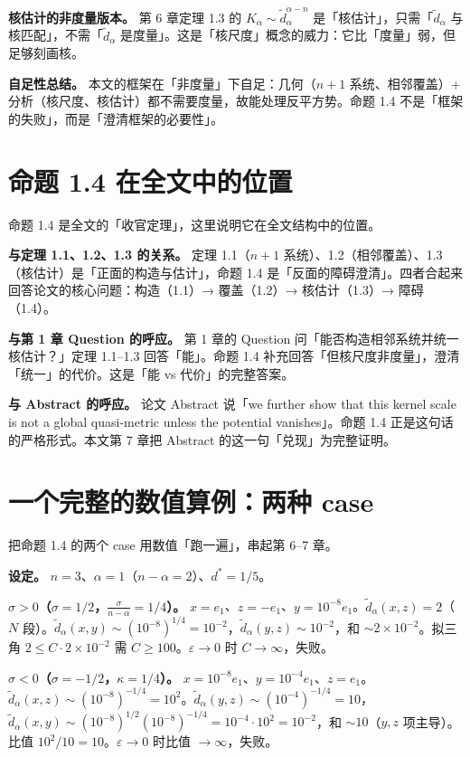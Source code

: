 \documentclass[a4paper,11pt,openany]{ctexbook}
\numberwithin{equation}{chapter}
\numberwithin{figure}{chapter}
\numberwithin{table}{chapter}
\begin{document}
\textbf{核估计的非度量版本。} 第 6 章定理 1.3 的 $K_\alpha\sim\widetilde d_\alpha^{\alpha-n}$ 是「核估计」，只需「$\widetilde d_\alpha$ 与核匹配」，不需「$\widetilde d_\alpha$ 是度量」。这是「核尺度」概念的威力：它比「度量」弱，但足够刻画核。

\textbf{自足性总结。} 本文的框架在「非度量」下自足：几何（$n+1$ 系统、相邻覆盖）+ 分析（核尺度、核估计）都不需要度量，故能处理反平方势。命题 1.4 不是「框架的失败」，而是「澄清框架的必要性」。

\section{命题 1.4 在全文中的位置}

命题 1.4 是全文的「收官定理」，这里说明它在全文结构中的位置。

\textbf{与定理 1.1、1.2、1.3 的关系。} 定理 1.1（$n+1$ 系统）、1.2（相邻覆盖）、1.3（核估计）是「正面的构造与估计」，命题 1.4 是「反面的障碍澄清」。四者合起来回答论文的核心问题：构造（1.1）→ 覆盖（1.2）→ 核估计（1.3）→ 障碍（1.4）。

\textbf{与第 1 章 Question 的呼应。} 第 1 章的 Question 问「能否构造相邻系统并统一核估计？」定理 1.1–1.3 回答「能」。命题 1.4 补充回答「但核尺度非度量」，澄清「统一」的代价。这是「能 vs 代价」的完整答案。

\textbf{与 Abstract 的呼应。} 论文 Abstract 说「we further show that this kernel scale is not a global quasi-metric unless the potential vanishes」。命题 1.4 正是这句话的严格形式。本文第 7 章把 Abstract 的这一句「兑现」为完整证明。

\section{一个完整的数值算例：两种 case}

把命题 1.4 的两个 case 用数值「跑一遍」，串起第 6–7 章。

\textbf{设定。} $n=3$、$\alpha=1$（$n-\alpha=2$）、$d^*=1/5$。

\textbf{$\sigma>0$（$\sigma=1/2$，$\frac{\sigma}{n-\alpha}=1/4$）。} $x=e_1$、$z=-e_1$、$y=10^{-8}e_1$。$\widetilde d_\alpha(x,z)=2$（$N$ 段）。$\widetilde d_\alpha(x,y)\sim(10^{-8})^{1/4}=10^{-2}$，$\widetilde d_\alpha(y,z)\sim10^{-2}$，和 $\sim2\times10^{-2}$。拟三角 $2\le C\cdot2\times10^{-2}$ 需 $C\ge100$。$\varepsilon\to0$ 时 $C\to\infty$，失败。

\textbf{$\sigma<0$（$\sigma=-1/2$，$\kappa=1/4$）。} $x=10^{-8}e_1$、$y=10^{-4}e_1$、$z=e_1$。$\widetilde d_\alpha(x,z)\sim(10^{-8})^{-1/4}=10^2$。$\widetilde d_\alpha(y,z)\sim(10^{-4})^{-1/4}=10$，$\widetilde d_\alpha(x,y)\sim(10^{-8})^{1/2}(10^{-8})^{-1/4}=10^{-4}\cdot10^2=10^{-2}$，和 $\sim10$（$y,z$ 项主导）。比值 $10^2/10=10$。$\varepsilon\to0$ 时比值 $\to\infty$，失败。
\end{document}
